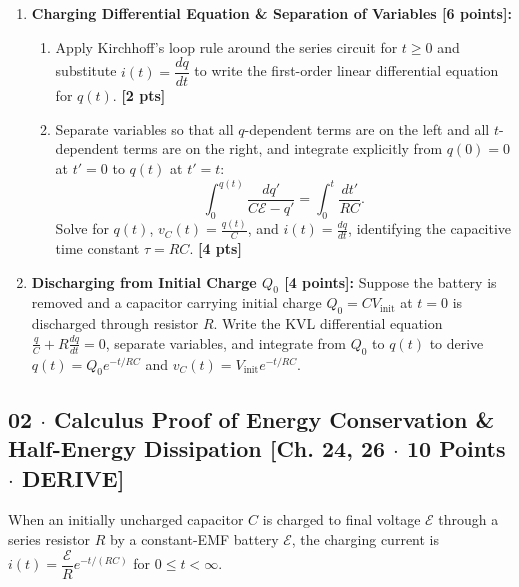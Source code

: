 \documentclass[10pt,letterpaper]{article}
\begin{document}
\begin{enumerate}
  \item \textbf{Charging Differential Equation \& Separation of Variables [6 points]:}
    \begin{enumerate}
      \item Apply Kirchhoff's loop rule around the series circuit for $t \ge 0$ and substitute $i(t) = \dfrac{dq}{dt}$ to write the first-order linear differential equation for $q(t)$. \textbf{[2 pts]}
      \item Separate variables so that all $q$-dependent terms are on the left and all $t$-dependent terms are on the right, and integrate explicitly from $q(0) = 0$ at $t' = 0$ to $q(t)$ at $t' = t$:
      $$\int_{0}^{q(t)} \frac{dq'}{C\mathcal{E} - q'} = \int_{0}^{t} \frac{dt'}{RC}.$$
      Solve for $q(t)$, $v_C(t) = \frac{q(t)}{C}$, and $i(t) = \frac{dq}{dt}$, identifying the capacitive time constant $\tau = RC$. \textbf{[4 pts]}
    \end{enumerate}
  
  \item \textbf{Discharging from Initial Charge $Q_0$ [4 points]:} Suppose the battery is removed and a capacitor carrying initial charge $Q_0 = C V_{\text{init}}$ at $t = 0$ is discharged through resistor $R$. Write the KVL differential equation $\frac{q}{C} + R\frac{dq}{dt} = 0$, separate variables, and integrate from $Q_0$ to $q(t)$ to derive $q(t) = Q_0 e^{-t/RC}$ and $v_C(t) = V_{\text{init}} e^{-t/RC}$.
\end{enumerate}
\vspace{1.2in}


\newpage



\subsection*{02 $\cdot$ Calculus Proof of Energy Conservation \& Half-Energy Dissipation \hfill [Ch. 24, 26 $\cdot$ 10 Points $\cdot$ DERIVE]}

When an initially uncharged capacitor $C$ is charged to final voltage $\mathcal{E}$ through a series resistor $R$ by a constant-EMF battery $\mathcal{E}$, the charging current is $i(t) = \dfrac{\mathcal{E}}{R} e^{-t/(RC)}$ for $0 \le t < \infty$.
\end{document}
